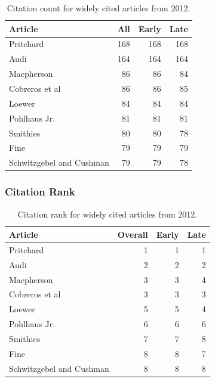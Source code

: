 \documentclass[
  10pt,
  letterpaper,
  DIV=11,
  numbers=noendperiod,
  twoside]{scrartcl}
\begin{document}
\begin{longtable}[]{@{}lrrr@{}}

\caption{\label{tbl-citation-count-2012}Citation count for widely cited
articles from 2012.}

\tabularnewline

\toprule\noalign{}
Article & All & Early & Late \\
\midrule\noalign{}
\endhead
\bottomrule\noalign{}
\endlastfoot
Pritchard & 168 & 168 & 168 \\
Audi & 164 & 164 & 164 \\
Macpherson & 86 & 86 & 84 \\
Cobreros et al & 86 & 86 & 85 \\
Loewer & 84 & 84 & 84 \\
Pohlhaus Jr. & 81 & 81 & 81 \\
Smithies & 80 & 80 & 78 \\
Fine & 79 & 79 & 79 \\
Schwitzgebel and Cushman & 79 & 79 & 78 \\

\end{longtable}

\subsubsection*{Citation Rank}\label{citation-rank-36}

\begin{longtable}[]{@{}lrrr@{}}

\caption{\label{tbl-citation-rank-2012}Citation rank for widely cited
articles from 2012.}

\tabularnewline

\toprule\noalign{}
Article & Overall & Early & Late \\
\midrule\noalign{}
\endhead
\bottomrule\noalign{}
\endlastfoot
Pritchard & 1 & 1 & 1 \\
Audi & 2 & 2 & 2 \\
Macpherson & 3 & 3 & 4 \\
Cobreros et al & 3 & 3 & 3 \\
Loewer & 5 & 5 & 4 \\
Pohlhaus Jr. & 6 & 6 & 6 \\
Smithies & 7 & 7 & 8 \\
Fine & 8 & 8 & 7 \\
Schwitzgebel and Cushman & 8 & 8 & 8 \\

\end{longtable}
\end{document}
